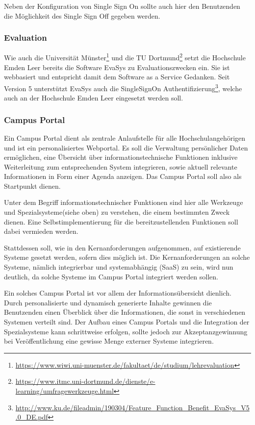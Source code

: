 Neben der Konfiguration von Single Sign On sollte auch hier den Benutzenden die Möglichkeit des Single Sign Off gegeben werden.

\subsubsection{Evaluation}
Wie auch die Universität Münster\footnote{\url{https://www.wiwi.uni-muenster.de/fakultaet/de/studium/lehrevaluation}} und die TU Dortmund\footnote{\url{https://www.itmc.uni-dortmund.de/dienste/e-learning/umfragewerkzeuge.html}} setzt die Hochschule Emden Leer bereits die Software EvaSys zu Evaluationszwecken ein. Sie ist webbasiert und entspricht damit dem Software as a Service Gedanken.
Seit Version 5 unterstützt EvaSys auch die SingleSignOn Authentifizierung\footnote{\url{http://www.ku.de/fileadmin/190304/Feature_Function_Benefit_EvaSys_V5.0_DE.pdf}}, welche auch an der Hochschule Emden Leer eingesetzt werden soll.

\subsubsection{Campus Portal}
Ein Campus Portal dient als zentrale Anlaufstelle für alle Hochschulangehörigen und ist ein personalisiertes Webportal. Es soll die Verwaltung persönlicher Daten ermöglichen, eine Übersicht über informationstechnische Funktionen inklusive Weiterleitung zum entsprechenden System integrieren, sowie aktuell relevante Informationen in Form einer Agenda anzeigen. Das Campus Portal soll also als Startpunkt dienen.

Unter dem Begriff informationstechnischer Funktionen sind hier alle Werkzeuge und Spezialsysteme(siehe oben) zu verstehen, die einem bestimmten Zweck dienen. Eine Selbstimplementierung für die bereitzustellenden Funktionen soll dabei vermieden werden.

Stattdessen soll, wie in den Kernanforderungen aufgenommen, auf existierende Systeme gesetzt werden, sofern dies möglich ist. Die Kernanforderungen an solche Systeme, nämlich integrierbar und systemabhängig (SaaS) zu sein, wird nun deutlich, da solche Systeme im Campus Portal integriert werden sollen.

Ein solches Campus Portal ist vor allem der Informationsübersicht dienlich. Durch personalisierte und dynamisch generierte Inhalte gewinnen die Benutzenden einen Überblick über die Informationen, die sonst in verschiedenen Systemen verteilt sind. Der Aufbau eines Campus Portals und die Integration der Spezialsysteme kann schrittweise erfolgen, sollte jedoch zur Akzeptanzgewinnung bei Veröffentlichung eine gewisse Menge externer Systeme integrieren.

